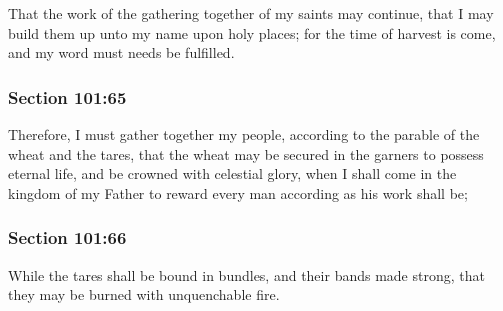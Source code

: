 		That the work of the gathering together of my saints may continue, that I may build them up unto my name upon holy places; for the time of harvest is come, and my word must needs be fulfilled.


	\subsubsection{Section 101:65} %
		\label{DC101-65}

		Therefore, I must gather together my people, according to the parable of the wheat and the tares, that the wheat may be secured in the garners to possess eternal life, and be crowned with celestial glory, when I shall come in the kingdom of my Father to reward every man according as his work shall be;


	\subsubsection{Section 101:66} %
		\label{DC101-66}

		While the tares shall be bound in bundles, and their bands made strong, that they may be burned with unquenchable fire.


